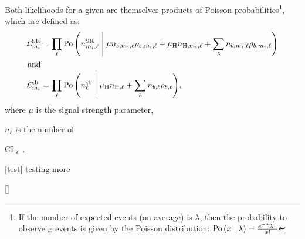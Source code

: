 Both likelihoods for a given  are themselves products of Poisson probabilities\footnote
{
    If the number of expected events (on average) is $\lambda$, then the probability to observe $x$ events is given by the Poisson distribution:
    $\text{Po}\left( x \; \middle| \;{} \lambda \right) = \frac{e^{-\lambda} \lambda^x}{x!}$
},
which are defined as:
\begin{align*}
    \lhoodSR &= \prod_\ell{
        \poisson{
            n^\text{SR}_{\mass{i},\ell}
            \middlepipe
            \mu n_{s, \mass{i}, \ell} \rho_{s, \mass{i}, \ell} + \mu_\PH n_{\PH, \mass{i}, \ell} + 
            \sum_b{
                n_{b, \mass{i}, \ell} \rho_{b, \mass{i}, \ell}
                }
            }
    }
    \\
    \text{and} &
    \\
    \lhoodsb &= \prod_\ell{
        \poisson{
            n^\text{sb}_{\ell}
            \middlepipe
            \mu_\PH n_{\PH, \ell} + 
            \sum_b{
                n_{b, \ell} \rho_{b, \ell}
                }
            }
    },
\end{align*}
where $\mu$ is the signal strength parameter, 

$n_\ell$ is the number of 

CL$_\text{s}$~\cite{cowan_asymptotic_2011}.

\begin{multiFigure}
        \centering
            [test]
            {testing more}
        \label{fig:yield_hzzd_mZ2}
\end{multiFigure}

\begin{multiFigure}
        \centering
        \label{fig:yield_hzdzd_mZ12}
\end{multiFigure}

\begin{multiFigure}
        \centering
            []
            {}
        \label{fig:exclus_lim_BR_hzzd}
\end{multiFigure}

